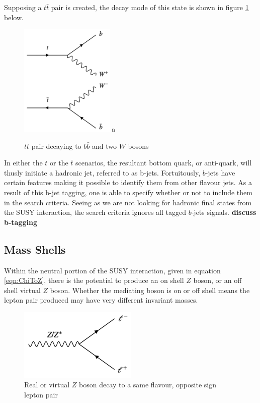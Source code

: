 Supposing a $t \bar{t}$ pair is created, the decay mode of this state is shown in figure \ref{fig:ttbar} below.

\begin{figure}[H] %
   \centering
   \includegraphics[width=0.4\textwidth]{Pictures/ttbar.png} a
   \caption{$t \bar{t}$ pair decaying to $b \bar{b}$ and two $W$ bosons}
   \label{fig:ttbar}
\end{figure}

\noindent In either the $t$ or the $\bar{t}$ scenarios, the resultant bottom quark, or anti-quark, will thusly initiate a hadronic jet, referred to as b-jets.
Fortuitously, $b$-jets have certain features making it possible to identify them from other flavour jets.  
As a result of this b-jet tagging, one is able to specify whether or not to include them in the search criteria.
Seeing as we are not looking for hadronic final states from the SUSY interaction, the search criteria ignores all tagged $b$-jets signals.
\textbf{\large discuss b-tagging}

\subsection{Mass Shells} \label{subsec:MassShells}
Within the neutral portion of the SUSY interaction, given in equation \ref{eqn:ChiToZ}, there is the potential to produce an on shell $Z$ boson, or an off shell virtual $Z$ boson.
Whether the mediating boson is on or off shell means the lepton pair produced may have very different invariant masses.

\begin{figure}[H] %
   \centering
   \includegraphics[width=0.5\textwidth]{Pictures/ZtoLL.png} 
   \caption{Real or virtual $Z$ boson decay to a same flavour, opposite sign lepton pair}
   \label{fig:example}
\end{figure}

